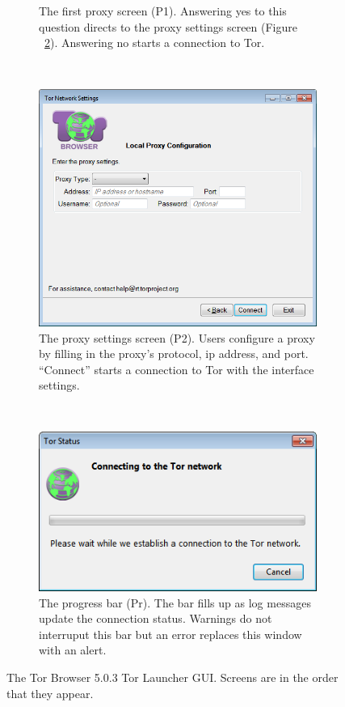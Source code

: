 \documentclass[USenglish,oneside,twocolumn]{article}
\begin{document}
\begin{figure}
\begin{subfigure}[b]{0.30\textwidth}
	\centering\captionsetup{width=1.5\linewidth}%
	\caption{The first proxy screen (P1). Answering yes to this question directs to the proxy settings screen (Figure ~\ref{fig:old-proxy-yes}). Answering no starts a connection to Tor.}
	\label{fig:old-proxy}
\end{subfigure}
~~~~~~~~~~
\begin{subfigure}[b]{0.30\textwidth}
	\includegraphics[width=\textwidth]{screenshots/OLD-proxyYES.png}
	\centering\captionsetup{width=1.5\linewidth}%
	\caption{The proxy settings screen (P2). Users configure a proxy by filling in the proxy's protocol, ip address, and port. ``Connect'' starts a connection to Tor with the interface settings.}
	\label{fig:old-proxy-yes}
\end{subfigure}
~~~~~~~~~~~~~~~~~~~~~~~~~
\begin{subfigure}[b]{0.30\textwidth}
	\includegraphics[width=\textwidth]{screenshots/OLD-progress.png}
	\centering\captionsetup{width=1.5\linewidth}%
	\caption{The progress bar (Pr). The bar fills up as log messages update the connection status. Warnings do not interruput this bar but an error replaces this window with an alert. }
	\label{fig:old-progress}
\end{subfigure}
\caption{
The Tor Browser 5.0.3 Tor Launcher GUI. Screens are in the order that they appear. 
}
\label{fig:old-interface}
\end{figure} 
\end{document}
